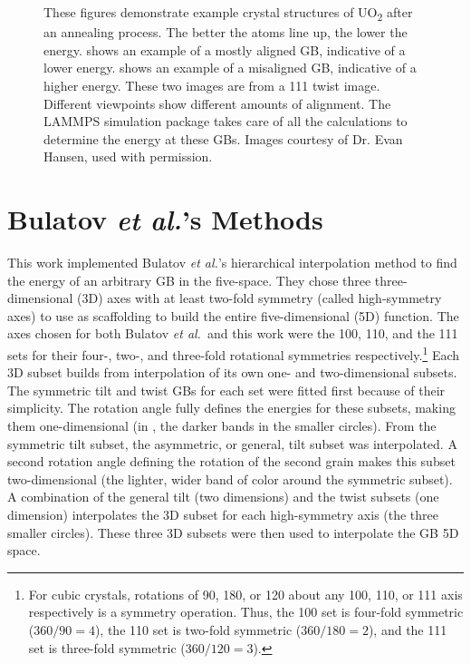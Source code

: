 \documentclass[twoside,senior]{BYUPhys}
\begin{document}
\begin{figure}[ht!]
 \caption[Example of crystal structures after annealing.]{\label{fig:lammps}These figures demonstrate example crystal structures of UO\textsubscript{2} after an annealing process.  The better the atoms line up, the lower the energy. \protect{} shows an example of a mostly aligned GB, indicative of a lower energy.  \protect{} shows an example of a misaligned GB, indicative of a higher energy.  These two images are from a \textlangle{}111\textrangle{} twist image.  Different viewpoints show different amounts of alignment.  The LAMMPS simulation package takes care of all the calculations to determine the energy at these GBs. Images courtesy of Dr. Evan Hansen, used with permission.}
\end{figure}

\section{Bulatov \emph{et al.}'s Methods\label{methods:bulatov}}
This work implemented Bulatov \emph{et al.}'s hierarchical interpolation method to find the energy of an arbitrary GB in the five-space.\cite{bulatov2014}  They chose three three-dimensional (3D) axes with at least two-fold symmetry (called high-symmetry axes) to use as scaffolding to build the entire five-dimensional (5D) function.  The axes chosen for both Bulatov \emph{et al.}\ and this work were the \textlangle{}100\textrangle{}, \textlangle{}110\textrangle{}, and the \textlangle{}111\textrangle{} sets for their four-, two-, and three-fold rotational symmetries respectively.\footnote{For cubic crystals, rotations of 90\textdegree{}, 180\textdegree{}, or 120\textdegree{} about any \textlangle{}100\textrangle{}, \textlangle{}110\textrangle{}, or \textlangle{}111\textrangle{} axis respectively is a symmetry operation.\cite{stokes2007}  Thus, the \textlangle{}100\textrangle{} set is four-fold symmetric (360\textdegree{}$/90$\textdegree{}$=4$), the \textlangle{}110\textrangle{} set is two-fold symmetric (360\textdegree{}$/180$\textdegree{}$=2$), and the \textlangle{}111\textrangle{} set is three-fold symmetric (360\textdegree{}$/120$\textdegree{}$=3$).}  Each 3D subset builds from interpolation of its own one- and two-dimensional subsets.  The symmetric tilt and twist GBs for each set were fitted first because of their simplicity.  The rotation angle fully defines the energies for these subsets, making them one-dimensional (in , the darker bands in the smaller circles).  From the symmetric tilt subset, the asymmetric, or general, tilt subset was interpolated.  A second rotation angle defining the rotation of the second grain makes this subset two-dimensional (the lighter, wider band of color around the symmetric subset).  A combination of the general tilt (two dimensions) and the twist subsets (one dimension) interpolates the 3D subset for each high-symmetry axis (the three smaller circles).  These three 3D subsets were then used to interpolate the GB 5D space.
\end{document}
